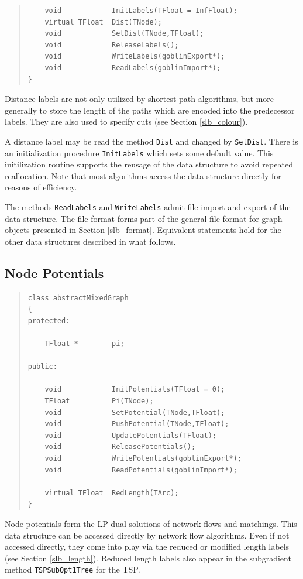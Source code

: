 \documentclass[a4paper,11pt,twoside]{book}
\begin{document}
\begin{multicols}{2}
\begin{quote}
\begin{verbatim}
    void            InitLabels(TFloat = InfFloat);
    virtual TFloat  Dist(TNode);
    void            SetDist(TNode,TFloat);
    void            ReleaseLabels();
    void            WriteLabels(goblinExport*);
    void            ReadLabels(goblinImport*);
}
\end{verbatim}
\end{quote}
Distance labels are not only utilized by shortest path algorithms, but more
generally to store the length of the paths which are encoded into the
predecessor labels. They are also used to specify cuts
(see Section \ref{slb_colour}).

A distance label may be read the method \verb/Dist/ and changed by
\verb/SetDist/. There is an initialization procedure \verb/InitLabels/
which sets some default value. This initilization routine supports the
reusage of the data structure to avoid repeated reallocation. Note that most
algorithms access the data structure directly for reasons of efficiency.

The methods \verb/ReadLabels/ and \verb/WriteLabels/ admit file import and
export of the data structure. The file format forms part of the general file
format for graph objects presented in Section \ref{slb_format}. Equivalent
statements hold for the other data structures described in what follows.


\subsection{Node Potentials}
\label{slb_pot}
\methods
\begin{quote}
\begin{verbatim}
class abstractMixedGraph
{
protected:

    TFloat *        pi;

public:

    void            InitPotentials(TFloat = 0);
    TFloat          Pi(TNode);
    void            SetPotential(TNode,TFloat);
    void            PushPotential(TNode,TFloat);
    void            UpdatePotentials(TFloat);
    void            ReleasePotentials();
    void            WritePotentials(goblinExport*);
    void            ReadPotentials(goblinImport*);

    virtual TFloat  RedLength(TArc);
}
\end{verbatim}
\end{quote}
Node potentials form the LP dual solutions of network flows and matchings.
This data structure can be accessed directly by network flow algorithms.
Even if not accessed directly, they come into play via the reduced or modified
length labels (see Section \ref{slb_length}). Reduced length labels also
appear in the subgradient method \verb/TSPSubOpt1Tree/ for the TSP.


\end{multicols}
\end{document}
